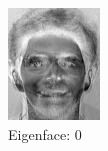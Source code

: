 \documentclass[12pt]{article}
\begin{document}
\begin{figure}
	\centering
	\begin{subfigure}[b]{0.20\textwidth}
		\includegraphics[width=\textwidth]{Task4.6_Images/PrincipalComponent0.jpg}
		\caption{Eigenface: 0}
	\end{subfigure}\quad
	\begin{subfigure}[b]{0.20\textwidth}

\end{subfigure}
\end{figure}
\end{document}
